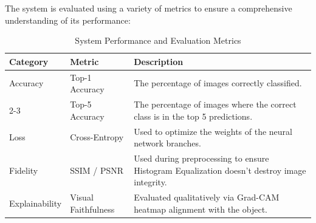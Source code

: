 The system is evaluated using a variety of metrics to ensure a comprehensive understanding of its performance:

\begin{table}[h!]
\centering
\caption{System Performance and Evaluation Metrics}
\label{tab:metrics}
\begin{tabular}{|l|l|p{8cm}|}
\hline
\textbf{Category} & \textbf{Metric} & \textbf{Description} \\ \hline
Accuracy & Top-1 Accuracy & The percentage of images correctly classified. \\ \cline{2-3} 
 & Top-5 Accuracy & The percentage of images where the correct class is in the top 5 predictions. \\ \hline
Loss & Cross-Entropy & Used to optimize the weights of the neural network branches. \\ \hline
Fidelity & SSIM / PSNR & Used during preprocessing to ensure Histogram Equalization doesn't destroy image integrity. \\ \hline
Explainability & Visual Faithfulness & Evaluated qualitatively via Grad-CAM heatmap alignment with the object. \\ \hline
\end{tabular}
\end{table}
